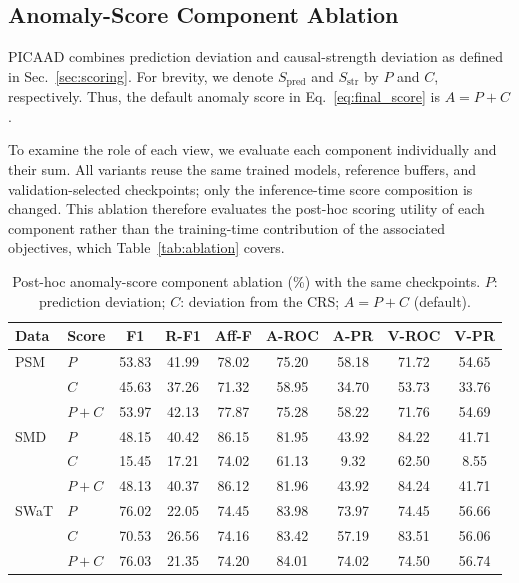 \subsection{Anomaly-Score Component Ablation}
\label{sec:ablation_score}

PICAAD combines prediction deviation and causal-strength deviation as defined
in Sec.~\ref{sec:scoring}. For brevity, we denote
\(S_{\mathrm{pred}}\) and \(S_{\mathrm{str}}\) by \(P\) and \(C\), respectively.
Thus, the default anomaly score in Eq.~\eqref{eq:final_score} is \(A=P+C\).

To examine the role of each view, we evaluate each component individually and
their sum. All variants reuse the same trained models, reference buffers, and
validation-selected checkpoints; only the inference-time score composition is
changed. This ablation therefore evaluates the post-hoc scoring utility of
each component rather than the training-time contribution of the associated
objectives, which Table~\ref{tab:ablation} covers.

\begin{table}[t]
\centering
\caption{Post-hoc anomaly-score component ablation (\%) with the same checkpoints. \(P\): prediction deviation; \(C\): deviation from the CRS; \(A=P+C\) (default).}
\label{tab:score_ablation}
\small
\setlength{\tabcolsep}{2.6pt}
\begin{tabular}{llccccccc}
\toprule
Data & Score & F1 & R-F1 & Aff-F & A-ROC & A-PR & V-ROC & V-PR \\
\midrule
PSM  & \(P\)     & 53.83 & 41.99 & 78.02 & 75.20 & 58.18 & 71.72 & 54.65 \\
     & \(C\)     & 45.63 & 37.26 & 71.32 & 58.95 & 34.70 & 53.73 & 33.76 \\
     & \(P{+}C\) & 53.97 & 42.13 & 77.87 & 75.28 & 58.22 & 71.76 & 54.69 \\
\midrule
SMD  & \(P\)     & 48.15 & 40.42 & 86.15 & 81.95 & 43.92 & 84.22 & 41.71 \\
     & \(C\)     & 15.45 & 17.21 & 74.02 & 61.13 &  9.32 & 62.50 &  8.55 \\
     & \(P{+}C\) & 48.13 & 40.37 & 86.12 & 81.96 & 43.92 & 84.24 & 41.71 \\
\midrule
SWaT & \(P\)     & 76.02 & 22.05 & 74.45 & 83.98 & 73.97 & 74.45 & 56.66 \\
     & \(C\)     & 70.53 & 26.56 & 74.16 & 83.42 & 57.19 & 83.51 & 56.06 \\
     & \(P{+}C\) & 76.03 & 21.35 & 74.20 & 84.01 & 74.02 & 74.50 & 56.74 \\
\bottomrule
\end{tabular}
\end{table}

